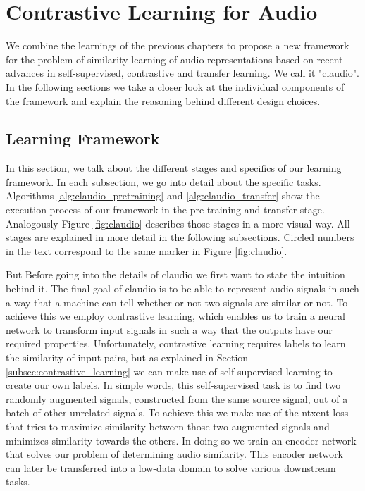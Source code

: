 
\chapter{Contrastive Learning for Audio}\label{chapter:claudio}

We combine the learnings of the previous chapters to propose a new framework for the problem of similarity learning of audio representations based on recent advances in self-supervised, contrastive and transfer learning. We call it "\gls{claudio}". In the following sections we take a closer look at the individual components of the framework and explain the reasoning behind different design choices.

\section{Learning Framework}

In this section, we talk about the different stages and specifics of our learning framework. In each subsection, we go into detail about the specific tasks. Algorithms \ref{alg:claudio_pretraining} and \ref{alg:claudio_transfer} show the execution process of our framework in the pre-training and transfer stage. Analogously Figure \ref{fig:claudio} describes those stages in a more visual way. All stages are explained in more detail in the following subsections. Circled numbers in the text correspond to the same marker in Figure \ref{fig:claudio}.

But Before going into the details of \gls{claudio} we first want to state the intuition behind it. The final goal of \gls{claudio} is to be able to represent audio signals in such a way that a machine can tell whether or not two signals are similar or not. To achieve this we employ contrastive learning, which enables us to train a neural network to transform input signals in such a way that the outputs have our required properties. Unfortunately, contrastive learning requires labels to learn the similarity of input pairs, but as explained in Section \ref{subsec:contrastive_learning} we can make use of self-supervised learning to create our own labels. In simple words, this self-supervised task is to find two randomly augmented signals, constructed from the same source signal, out of a batch of other unrelated signals. To achieve this we make use of the \gls{ntxent} loss that tries to maximize similarity between those two augmented signals and minimizes similarity towards the others. In doing so we train an encoder network that solves our problem of determining audio similarity. This encoder network can later be transferred into a low-data domain to solve various downstream tasks.

